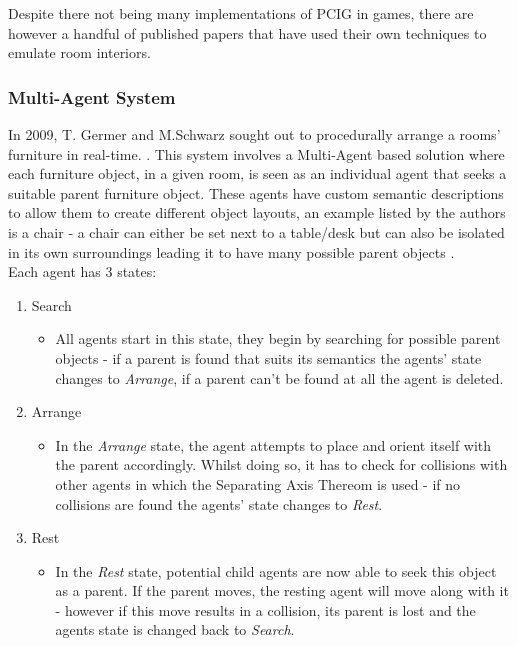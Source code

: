 Despite there not being many implementations of PCIG in games, there are however a handful of published papers that have used their own techniques to emulate room interiors.
\subsubsection*{Multi-Agent System}
In 2009, T. Germer and M.Schwarz sought out to procedurally arrange a rooms' furniture in real-time. \cite{real-time-walkthroughs}\cite{youtube:real-time-walkthroughs}. This system involves a Multi-Agent based solution where each furniture object, in a given room, is seen as an individual agent that seeks a suitable parent furniture object. These agents have custom semantic descriptions to allow them to create different object layouts, an example listed by the authors is a chair - a chair can either be set next to a table/desk but can also be isolated in its own surroundings leading it to have many possible parent objects \cite{real-time-walkthroughs}.\\
Each agent has 3 states:
\begin{enumerate}
    \item Search
        \begin{itemize}
            \item All agents start in this state, they begin by searching for possible parent objects - if a parent is found that suits its semantics the agents' state changes to \textit{Arrange}, if a parent can't be found at all the agent is deleted.
        \end{itemize}
    \item Arrange
        \begin{itemize}
            \item In the \textit{Arrange} state, the agent attempts to place and orient itself with the parent accordingly. Whilst doing so, it has to check for collisions with other agents in which the Separating Axis Thereom is used \cite{separating-axis-thereom} - if no collisions are found the agents' state changes to \textit{Rest}.
        \end{itemize}
    \item Rest
        \begin{itemize}
            \item In the \textit{Rest} state, potential child agents are now able to seek this object as a parent. If the parent moves, the resting agent will move along with it - however if this move results in a collision, its parent is lost and the agents state is changed back to \textit{Search}.
        \end{itemize}
\end{enumerate}
